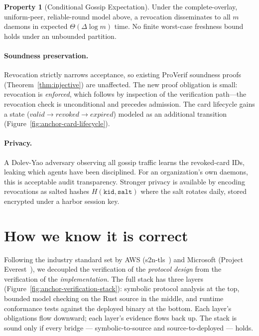 \documentclass[11pt,a4paper]{article}
\theoremstyle{definition}
\newtheorem{property}{Property}[section]
\begin{document}
\begin{property}[Conditional Gossip Expectation]\label{prop:fresh}
Under the complete-overlay, uniform-peer, reliable-round model above, a revocation disseminates to all $m$ daemons in expected $\Theta(\Delta\log m)$ time. No finite worst-case freshness bound holds under an unbounded partition.
\end{property}

\paragraph{Soundness preservation.} Revocation strictly narrows acceptance, so existing ProVerif soundness proofs (Theorem~\ref{thm:injective}) are unaffected. The new proof obligation is small: revocation is \emph{enforced}, which follows by inspection of the verification path---the revocation check is unconditional and precedes admission. The card lifecycle gains a state ($\textit{valid} \to \textit{revoked} \to \textit{expired}$) modeled as an additional transition (Figure~\ref{fig:anchor-card-lifecycle}).



\paragraph{Privacy.} A Dolev-Yao adversary observing all gossip traffic learns the revoked-card IDs, leaking which agents have been disciplined. For an organization's own daemons, this is acceptable audit transparency. Stronger privacy is available by encoding revocations as salted hashes $H(\texttt{kid}, \texttt{salt})$ where the salt rotates daily, stored encrypted under a harbor session key.

\section{How we know it is correct}\label{sec:correct}

Following the industry standard set by AWS (s2n-tls~\cite{aws2022s2n}) and Microsoft (Project Everest~\cite{bhargavan2017everest}), we decoupled the verification of the \textit{protocol design} from the verification of the \textit{implementation}. The full stack has three layers (Figure~\ref{fig:anchor-verification-stack}): symbolic protocol analysis at the top, bounded model checking on the Rust source in the middle, and runtime conformance tests against the deployed binary at the bottom. Each layer's obligations flow downward; each layer's evidence flows back up. The stack is sound only if every bridge --- symbolic-to-source and source-to-deployed --- holds.
\end{document}
